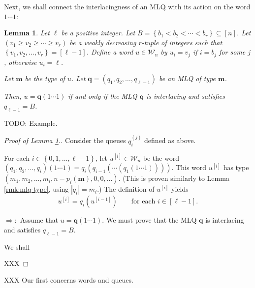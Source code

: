 \documentclass[reqno]{amsart}%
\newcommand{\0}{\phantom{c}}
\theoremstyle{plain}
\newtheorem{lemma}[thm]{Lemma}
\theoremstyle{definition}
\numberwithin{equation}{section}
\begin{document}
Next, we shall connect the interlacingness of an MLQ with its action on the
word $1\cdots1$:

\begin{lemma}
\label{lem:determinant_form.interl-act}Let $\ell$ be a positive integer. Let
$B=\left\{  b_{1}<b_{2}<\cdots<b_{r}\right\}  \subseteq\left[  n\right]  $.
Let $\left(  v_{1}\geq v_{2}\geq\dotsm\geq v_{r}\right)  $ be a weakly
decreasing $r$-tuple of integers such that $\left\{  v_{1},v_{2},\ldots
,v_{r}\right\}  =\left[  \ell-1\right]  $. Define a word $u\in\mathcal{W}_{n}$
by $u_{i}=v_{j}$ if $i=b_{j}$ for some $j$, otherwise $u_{i}=\ell$.

Let $\mathbf{m}$ be the type of $u$. Let $\mathbf{q}=\left(  q_{1}%
,q_{2},\ldots,q_{\ell-1}\right)  $ be an MLQ of type $\mathbf{m}$.

Then, $u=\mathbf{q}\left(  1\cdots1\right)  $ if and only if the MLQ
$\mathbf{q}$ is interlacing and satisfies $q_{\ell-1}=B$.
\end{lemma}

TODO: Example.

\begin{proof}
[Proof of Lemma \ref{lem:determinant_form.interl-act}.]Consider the queues
$q_{i}^{\left(  j\right)  }$ defined as above.

For each $i\in\left\{  0,1,\ldots,\ell-1\right\}  $, let $u^{\left[  i\right]
}\in\mathcal{W}_{n}$ be the word $\left(  q_{1},q_{2},\ldots,q_{i}\right)
\left(  1\cdots1\right)  =q_{i}\left(  q_{i-1}\left(  \cdots\left(
q_{1}\left(  1\cdots1\right)  \right)  \right)  \right)  $. This word
$u^{\left[  i\right]  }$ has type $\left(  m_{1},m_{2},\ldots,m_{i}%
,n-p_{i}\left(  \mathbf{m}\right)  ,0,0,\ldots\right)  $. (This is proven
similarly to Lemma \ref{rmk:mlq-type}, using $\left\vert q_{i}\right\vert
=m_{i}$.) The definition of $u^{\left[  i\right]  }$ yields%
\begin{equation}
u^{\left[  i\right]  }=q_{i}\left(  u^{\left[  i-1\right]  }\right)
\qquad\text{for each }i\in\left[  \ell-1\right]
.\label{pf.lem:determinant_form.interl-act.rec}%
\end{equation}


$\Longrightarrow:$ Assume that $u=\mathbf{q}\left(  1\cdots1\right)  $. We
must prove that the MLQ $\mathbf{q}$ is interlacing and satisfies $q_{\ell
-1}=B$.

We shall

XXX
\end{proof}

XXX Our first concerns words and queues.
\end{document}
